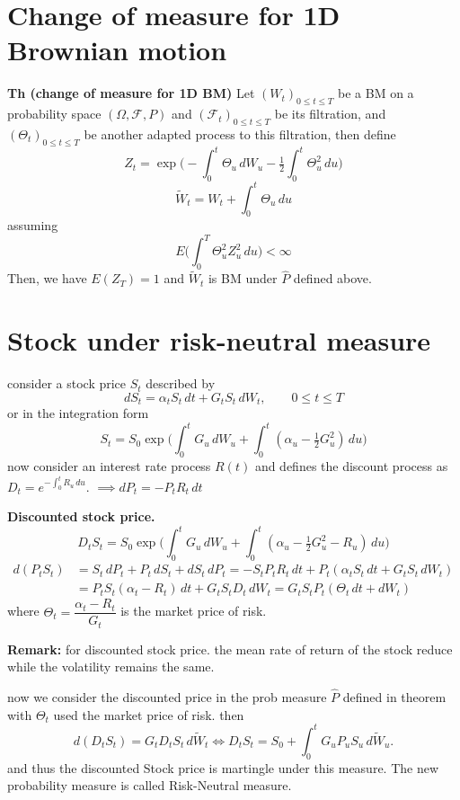 \documentclass[
  letterpaper,
  DIV=11,
  numbers=noendperiod]{scrreprt}
\theoremstyle{definition}
\theoremstyle{plain}
\theoremstyle{plain}
\theoremstyle{definition}
\theoremstyle{plain}
\theoremstyle{plain}
\theoremstyle{remark}
\begin{document}
\section{Change of measure for 1D Brownian
motion}\label{change-of-measure-for-1d-brownian-motion}

\textbf{Th (change of measure for 1D BM)} Let
\((W_t)_{0 \leq t \leq T}\) be a BM on a probability space
\((\Omega, \mathcal{F}, P)\) and \((\mathcal{F}_t)_{0 \leq t \leq T}\)
be its filtration, and \((\Theta_t)_{0 \leq t \leq T}\) be another
adapted process to this filtration, then define \[
Z_t = \exp\Big(-\int_0^t \Theta_u \, dW_u - \tfrac12 \int_0^t \Theta_u^2 \, du\Big)
\] \[
\widetilde{W}_t = W_t + \int_0^t \Theta_u \, du
\] assuming \[
E\Big(\int_0^T \Theta_u^2 Z_u^2 \, du\Big) < \infty
\] Then, we have \(E(Z_T) = 1\) and \(\widetilde{W}_t\) is BM under
\(\hat{P}\) defined above.

\section{Stock under risk-neutral
measure}\label{stock-under-risk-neutral-measure}

consider a stock price \(S_t\) described by \[
dS_t = \alpha_t S_t \, dt + G_t S_t \, dW_t, \qquad 0 \leq t \leq T
\] or in the integration form \[
S_t = S_0 \exp\Big(\int_0^t G_u \, dW_u + \int_0^t (\alpha_u - \tfrac12 G_u^2) \, du\Big)
\] now consider an interest rate process \(R(t)\) and defines the
discount process as \(D_t = e^{-\int_0^t R_u \, du}\).
\(\implies dP_t = -P_t R_t \, dt\)

\textbf{Discounted stock price.} \[
D_t S_t = S_0 \exp\Big(\int_0^t G_u \, dW_u + \int_0^t (\alpha_u - \tfrac12 G_u^2 - R_u) \, du\Big)
\] \[
\begin{aligned}
d(P_t S_t) &= S_t \, dP_t + P_t \, dS_t + dS_t \, dP_t = -S_t P_t R_t \, dt + P_t(\alpha_t S_t \, dt + G_t S_t \, dW_t) \\
&= P_t S_t(\alpha_t - R_t) \, dt + G_t S_t D_t \, dW_t = G_t S_t P_t(\Theta_t \, dt + dW_t)
\end{aligned}
\] where \(\Theta_t = \dfrac{\alpha_t - R_t}{G_t}\) is the market price
of risk.

\textbf{Remark:} for discounted stock price. the mean rate of return of
the stock reduce while the volatility remains the same.

now we consider the discounted price in the prob measure \(\hat{P}\)
defined in theorem with \(\Theta_t\) used the market price of risk. then
\[
d(D_t S_t) = G_t D_t S_t \, d\widetilde{W}_t \iff D_t S_t = S_0 + \int_0^t G_u P_u S_u \, d\widetilde{W}_u.
\] and thus the discounted Stock price is martingle under this measure.
The new probability measure is called Risk-Neutral measure.
\end{document}
